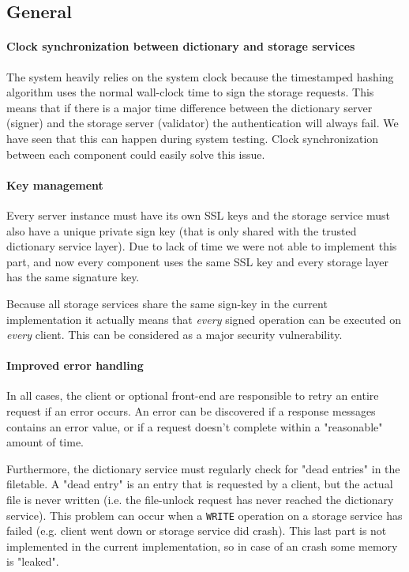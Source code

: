 \documentclass[12pt,a4paper]{scrartcl}
\begin{document}
\subsection{General}
\paragraph{Clock synchronization between dictionary and storage services}
The system heavily relies on the system clock because the timestamped hashing algorithm uses the normal wall-clock time to sign the storage requests. This means that if there is a major time difference between the dictionary server (signer) and the storage server (validator) the authentication will always fail. We have seen that this can happen during system testing. Clock synchronization between each component could easily solve this issue.

\paragraph{Key management}
Every server instance must have its own SSL keys and the storage service must also have a unique private sign key (that is only shared with the trusted dictionary service layer). Due to lack of time we were not able to implement this part, and now every component uses the same SSL key and every storage layer has the same signature key.

Because all storage services share the same sign-key in the current implementation it actually means that \emph{every} signed operation can be executed on \emph{every} client. This can be considered as a major security vulnerability.

\paragraph{Improved error handling}
In all cases, the client or optional front-end are responsible to retry an entire request if an error occurs. An error can be discovered if a response messages contains an error value, or if a request doesn't complete within a "reasonable" amount of time.

Furthermore, the dictionary service must regularly check for "dead entries" in the filetable. A "dead entry" is an entry that is requested by a client, but the actual file is never written (i.e. the file-unlock request has never reached the dictionary service). This problem can occur when a \verb|WRITE| operation on a storage service has failed (e.g. client went down or storage service did crash). This last part is not implemented in the current implementation, so in case of an crash some memory is "leaked".
\end{document}
